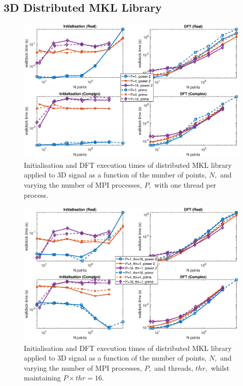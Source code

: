 \documentclass[a4paper]{article}
\begin{document}
\subsection{3D Distributed MKL Library}\label{Sec:3DDistMKL}

\begin{figure}[htb]
    \centering
    \includegraphics[width=0.9\linewidth]{../results/mkl_3d_mpi.eps}
  \caption{Initialisation and DFT execution times of distributed MKL library applied to 3D signal as a function of the
    number of points, $N,$ and varying the number of MPI processes, $P,$ with one thread per process.}
  \label{3DDistMKL}
\end{figure}

\begin{figure}[htb]
    \centering
    \includegraphics[width=0.9\linewidth]{../results/mkl_3d_mpi_thr.eps}
  \caption{Initialisation and DFT execution times of distributed MKL library applied to 3D signal as a function of the
    number of points, $N,$ and varying the number of MPI processes, $P,$ and threads, $thr,$ whilst maintaining $P\times thr=16.$}
  \label{3DDistMKL16}
\end{figure}
\end{document}

